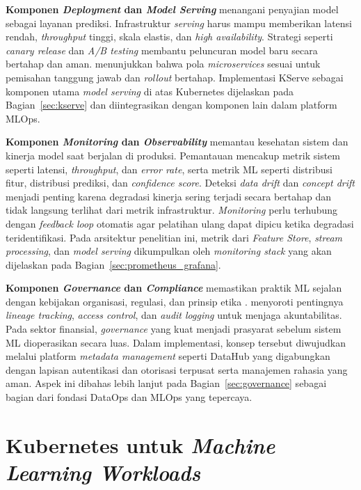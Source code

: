 \textbf{Komponen \textit{Deployment} dan \textit{Model Serving}} menangani penyajian model sebagai layanan prediksi. Infrastruktur \textit{serving} harus mampu memberikan latensi rendah, \textit{throughput} tinggi, skala elastis, dan \textit{high availability}. Strategi seperti \textit{canary release} dan \textit{A/B testing} membantu peluncuran model baru secara bertahap dan aman. \textcite{fowler2014microservices} menunjukkan bahwa pola \textit{microservices} sesuai untuk pemisahan tanggung jawab dan \textit{rollout} bertahap. Implementasi KServe sebagai komponen utama \textit{model serving} di atas Kubernetes dijelaskan pada Bagian~\ref{sec:kserve} dan diintegrasikan dengan komponen lain dalam platform MLOps.

\textbf{Komponen \textit{Monitoring} dan \textit{Observability}} memantau kesehatan sistem dan kinerja model saat berjalan di produksi. Pemantauan mencakup metrik sistem seperti latensi, \textit{throughput}, dan \textit{error rate}, serta metrik ML seperti distribusi fitur, distribusi prediksi, dan \textit{confidence score}. Deteksi \textit{data drift} dan \textit{concept drift} menjadi penting \autocite{bayram2022concept} karena degradasi kinerja sering terjadi secara bertahap dan tidak langsung terlihat dari metrik infrastruktur. \textit{Monitoring} perlu terhubung dengan \textit{feedback loop} otomatis agar pelatihan ulang dapat dipicu ketika degradasi teridentifikasi. Pada arsitektur penelitian ini, metrik dari \textit{Feature Store}, \textit{stream processing}, dan \textit{model serving} dikumpulkan oleh \textit{monitoring stack} yang akan dijelaskan pada Bagian~\ref{sec:prometheus_grafana}.

\textbf{Komponen \textit{Governance} dan \textit{Compliance}} memastikan praktik ML sejalan dengan kebijakan organisasi, regulasi, dan prinsip etika \autocite{bernardo2024data}. \textcite{stoyanovich2020responsible} menyoroti pentingnya \textit{lineage tracking}, \textit{access control}, dan \textit{audit logging} untuk menjaga akuntabilitas. Pada sektor finansial, \textit{governance} yang kuat menjadi prasyarat sebelum sistem ML dioperasikan secara luas. Dalam implementasi, konsep tersebut diwujudkan melalui platform \textit{metadata management} seperti DataHub yang digabungkan dengan lapisan autentikasi dan otorisasi terpusat serta manajemen rahasia yang aman. Aspek ini dibahas lebih lanjut pada Bagian~\ref{sec:governance} sebagai bagian dari fondasi DataOps dan MLOps yang tepercaya.

\section{Kubernetes untuk \textit{Machine Learning Workloads}}
\label{sec:kubernetes}

